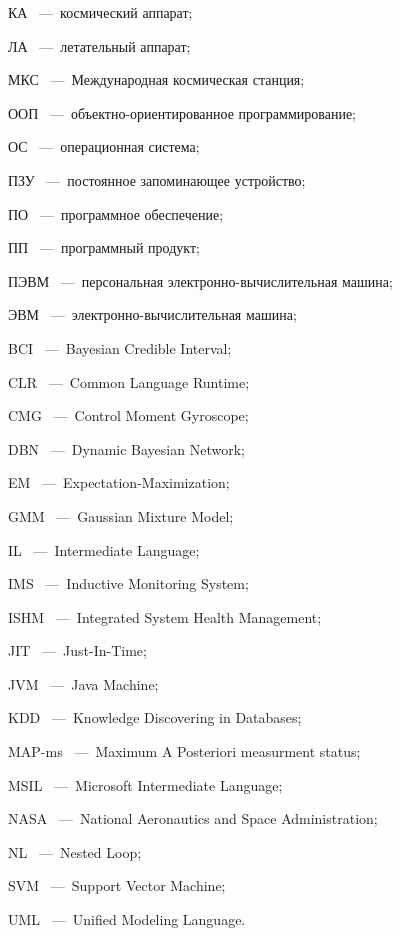 \begin{abbreviation}
\item[КА]~---~космический аппарат;
\item[ЛА]~---~летательный аппарат;
\item[МКС]~---~Международная космическая станция;
\item[ООП]~---~объектно-ориентированное программирование;
\item[ОС]~---~операционная система;
\item[ПЗУ]~---~постоянное запоминающее устройство;
\item[ПО]~---~программное обеспечение;
\item[ПП]~---~программный продукт;
\item[ПЭВМ]~---~персональная электронно-вычислительная машина;
\item[ЭВМ]~---~электронно-вычислительная машина;
\smallskip
\item[BCI]~---~Bayesian Credible Interval;
\item[CLR]~---~Common Language Runtime;
\item[CMG]~---~Control Moment Gyroscope;
\item[DBN]~---~Dynamic Bayesian Network;
\item[EM]~---~Expectation-Maximization;
\item[GMM]~---~Gaussian Mixture Model;
\item[IL]~---~Intermediate Language;
\item[IMS]~---~Inductive Monitoring System;
\item[ISHM]~---~Integrated System Health Management;
\item[JIT]~---~Just-In-Time;
\item[JVM]~---~Java Machine;
\item[KDD]~---~Knowledge Discovering in Databases;
\item[MAP-ms]~---~Maximum A Posteriori measurment status;
\item[MSIL]~---~Microsoft Intermediate Language;
\item[NASA]~---~National Aeronautics and Space Administration;
\item[NL]~---~Nested Loop;
\item[SVM]~---~Support Vector Machine;
\item[UML]~---~Unified Modeling Language.
\end{abbreviation}